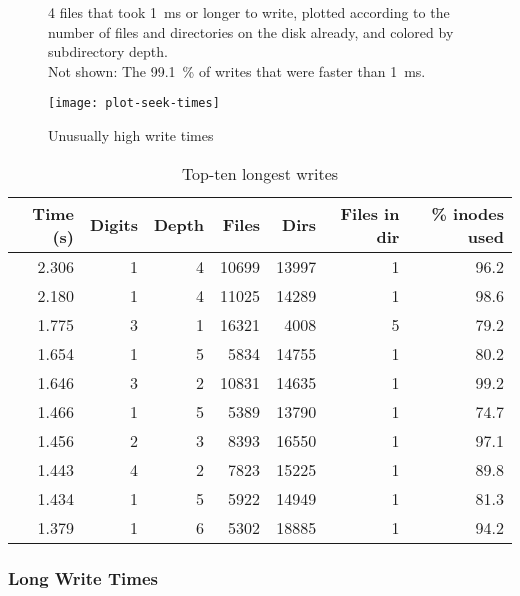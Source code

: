 \begin{figure}[p]
    \caption{Unusually high write times}
    \label{plot-seek-times}
    \centering

    \SI{4}{\kib} files that took \SI{1}{\ms} or longer to write, plotted
    according to the number of files and directories on the disk already, and
    colored by subdirectory depth. \\
    Not shown: The \SI{99.1}{\percent} of writes that were faster than
    \SI{1}{\ms}.

    \texttt{[image: plot-seek-times]}
\end{figure}

\begin{table}[p]
    \caption{Top-ten longest writes}
    \label{longest-writes}
    \begin{tabular}{r r r r r r r}
        Time (\si{\s}) & Digits & Depth & Files & Dirs & Files in dir & \% inodes used \\
        \midrule
2.306 & 1 & 4 & 10699 & 13997 &  1 & 96.2 \\
2.180 & 1 & 4 & 11025 & 14289 &  1 & 98.6 \\
1.775 & 3 & 1 & 16321 &  4008 &  5 & 79.2 \\
1.654 & 1 & 5 &  5834 & 14755 &  1 & 80.2 \\
1.646 & 3 & 2 & 10831 & 14635 &  1 & 99.2 \\
1.466 & 1 & 5 &  5389 & 13790 &  1 & 74.7 \\
1.456 & 2 & 3 &  8393 & 16550 &  1 & 97.1 \\
1.443 & 4 & 2 &  7823 & 15225 &  1 & 89.8 \\
1.434 & 1 & 5 &  5922 & 14949 &  1 & 81.3 \\
1.379 & 1 & 6 &  5302 & 18885 &  1 & 94.2 \\
    \end{tabular}
\end{table}

%


\subsubsection{Long Write Times}

